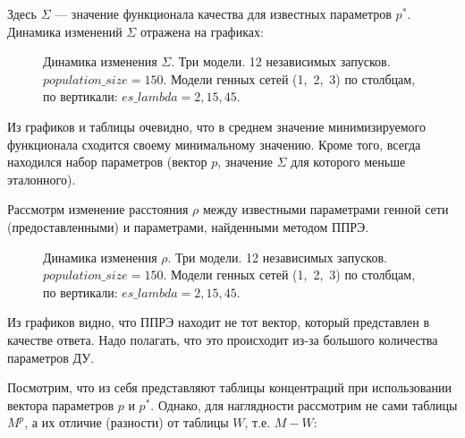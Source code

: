 Здесь $\Sigma$ — значение функционала качества для известных параметров $p^*$.
Динамика изменений $\Sigma$ отражена на графиках:

\begin{figure}[h]
  \center{\texttt{[image: p150]}}
  \caption{Динамика изменения $\Sigma$. Три модели. 12 независимых запусков. 
  $population\_size = 150$. Модели генных сетей (1,~2,~3) по столбцам, 
  по вертикали: $es\_lambda = 2, 15, 45$. }
  \label{img:p150}
\end{figure}

Из графиков и таблицы очевидно, что в среднем значение минимизируемого 
функционала сходится своему минимальному значению. Кроме того, всегда находился 
набор параметров (вектор $p$, значение $\Sigma$ для которого меньше эталонного).

Рассмотрм изменение расстояния $\rho$ между известными параметрами генной сети 
(предоставленными) и параметрами, найденными методом ППРЭ.

\begin{figure}[h]
  \center{\texttt{[image: p150e]}}
  \caption{Динамика изменения $\rho$. Три модели. 12 независимых запусков. 
  $population\_size = 150$. Модели генных сетей (1,~2,~3) по столбцам, 
  по вертикали: $es\_lambda = 2, 15, 45$. }
  \label{img:p150}
\end{figure}

Из графиков видно, что ППРЭ находит не тот вектор, который представлен в 
качестве ответа. Надо полагать, что это происходит из-за большого количества 
параметров ДУ.

Посмотрим, что из себя представляют таблицы концентраций при использовании 
вектора параметров $p$ и $p^*$. Однако, для наглядности рассмотрим не сами 
таблицы $M^p$, а их отличие (разности) от таблицы $W$, т.е. $M - W$:


